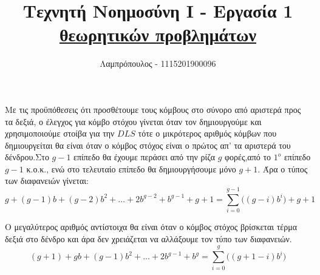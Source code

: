 \documentclass[14pt,fleqn]{extarticle}
\title{Τεχνητή Νοημοσύνη Ι - Εργασία 1\\[10pt] \underline{\largeΑπαντήσεις θεωρητικών προβλημάτων}}
\author{\LargeΒίκτωρ Λαμπρόπουλος - 1115201900096}
\begin{document}
\date{}
\maketitle
\begin{center}
\end{center}
\section*{}
\begin{adjustwidth}{2em}{0pt}
Με τις προϋπόθεσεις ότι προσθέτουμε τους κόμβους στο σύνορο από αριστερά προς τα δεξιά, ο έλεγχος για κόμβο στόχου γίνεται όταν τον δημιουργούμε και χρησιμοποιούμε στοίβα για την $DLS$ τότε ο μικρότερος αριθμός κόμβων που δημιουργείται θα είναι όταν ο κόμβος στόχος είναι ο πρώτος απ' τα αριστερά του δένδρου.Στο $g-1$ επίπεδο θα έχουμε περάσει από την ρίζα $g$ φορές,από το $1^ο$ επίπεδο $g-1$ κ.ο.κ., ενώ στο τελευταίο επίπεδο θα δημιουργήσουμε μόνο $g+1$. Άρα ο τύπος των διαφανειών γίνεται:\\[8pt]
\[g+(g-1)b+(g-2)b^2+\dots+2b^{g-2} + b^{g-1} + g + 1 = \sum_{i=0}^{g-1}\bigl((g-i)b^i\bigr)+g+1\]

Ο μεγαλύτερος αριθμός αντίστοιχα θα είναι όταν ο κόμβος στόχος βρίσκεται τέρμα δεξιά στο δένδρο και άρα δεν χρειάζεται να αλλάξουμε τον τύπο των διαφανειών.
\[(g+1)+gb+(g-1)b^2+\dots+2b^{g-1}+b^g = \sum_{i=0}^{g}\bigl((g+1-i)b^i\bigr)\]\\
\end{adjustwidth}
\newpage
\end{document}
